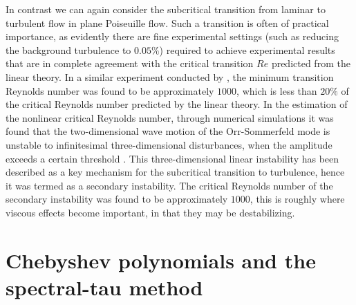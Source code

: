 \documentclass[a4paper, 12pt, twoside, openright]{article}
\numberwithin{equation}{section}
\begin{document}
In contrast we can again consider the subcritical transition from laminar to turbulent flow in plane Poiseuille flow. Such a transition is often of practical importance, as evidently there are fine experimental settings (such as reducing the background turbulence to $0.05\%$) required to achieve experimental results that are in complete agreement with the critical transition $Re$ predicted from the linear theory. In a similar experiment conducted by \cite{Nishioka85}, the minimum transition Reynolds number was found to be approximately $1000$, which is less than $20\%$ of the critical Reynolds number predicted by the linear theory. In the estimation of the nonlinear critical Reynolds number, through numerical simulations it was found that the two-dimensional wave motion of the Orr-Sommerfeld mode is unstable to infinitesimal three-dimensional disturbances, when the amplitude exceeds a certain threshold \citep{OrszagPatera83}. This three-dimensional linear instability has been described as a key mechanism for the subcritical transition to turbulence, hence it was termed as a secondary instability. The critical Reynolds number of the secondary instability was found to be approximately $1000$, this is roughly where viscous effects become important, in that they may be destabilizing. %

% 
%
%
%

\newpage
\section{Chebyshev polynomials and the spectral-tau method}\label{Chebyshevpoly_spectral}
\end{document}
